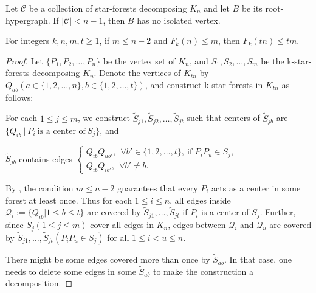 \documentclass[10pt,a4paper]{amsart}
\newcommand{\C}{\mathcal{C}}
\begin{document}
\begin{prop}\label{prop:no-iso}
Let $\C$ be a collection of star-forests decomposing $K_n$ and let $B$ be its root-hypergraph. If $|\C|<n-1$, then $B$ has no isolated vertex.
\end{prop}

\begin{lem}\label{lem:blowup}
For integers $k,n,m,t\ge 1$, if $m\le n-2$ and $F_k(n)\le m$, then $F_k(tn)\le tm$.
\end{lem}

\begin{proof}
Let $\{P_1,P_2,\dots,P_n\}$ be the vertex set of $K_n$, and $S_1,S_2,\dots,S_m$ be the k-star-forests decomposing $K_n$. Denote the vertices of $K_{tn}$ by $Q_{ab}(a\in\{1,2,\dots,n\}, b\in\{1,2,\dots,t\})$, and construct k-star-forests in $K_{tn}$ as follows:

For each $1\le j\le m$, we construct  $\tilde{S}_{j1},\tilde{S}_{j2},\dots,\tilde{S}_{jt}$ such that centers of $\tilde{S}_{jb}$ are $\{Q_{ib}~\big|~P_i~\text{is a center of}~S_j\}$, and
	
$\tilde{S}_{jb}$ contains edges 
$\begin{cases}
Q_{ib}Q_{ub'},~~ \forall b'\in\{1,2,\dots,t\},~\text{if }P_iP_u\in S_j,\\
Q_{ib}Q_{ib'},~~ \forall b'\neq b.
\end{cases}$
	
By , the condition $m\le n-2$ guarantees that every $P_i$ acts as a center in some forest at least once. Thus for each $1\le i\le n$, all edges inside $\mathcal{Q}_i:=\{Q_{ib}| 1\le b\le t\}$ are covered by $\tilde{S}_{j1},\dots,\tilde{S}_{jt}$ if $P_i$ is a center of $S_j$. Further, since $S_j (1\le j\le m)$ cover all edges in $K_n$, edges between $\mathcal{Q}_i$ and $\mathcal{Q}_u$ are covered by $\tilde{S}_{j1},\dots,\tilde{S}_{jt}(P_iP_u\in S_j)$ for all $1\le i<u\le n$.
	
There might be some edges covered more than once by $\tilde{S}_{ab}$. In that case, one needs to delete some edges in some $\tilde{S}_{ab}$ to make the construction a decomposition. 
\end{proof}
\end{document}
